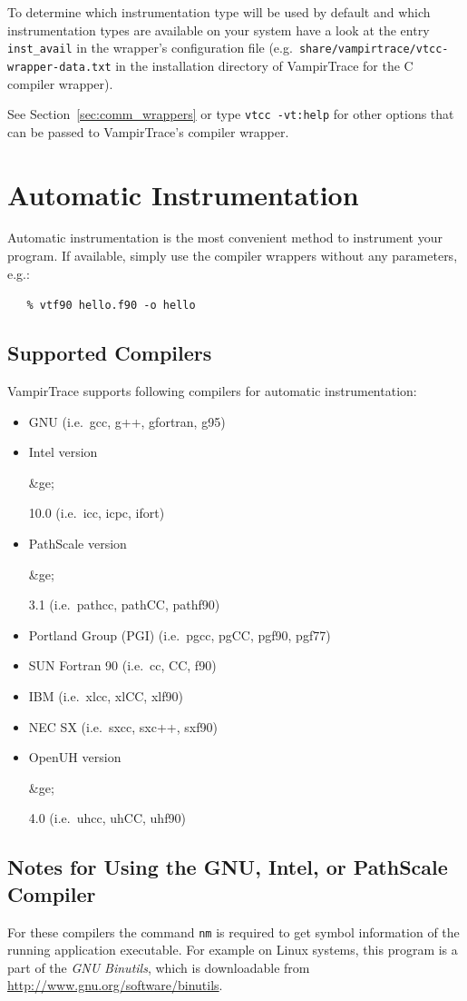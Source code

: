 \documentclass[a4paper,twoside,12pt,BCOR12mm]{scrbook}
\newcommand{\greq}{$\ge$}  %
\renewcommand{\greq}{\begin{rawhtml}&ge;\end{rawhtml}}   %
\newcommand{\pathname}[1]{\nolinkurl{#1}}  %
\renewcommand{\pathname}[1]{\texttt{#1}}   %
\begin{document}
To determine which instrumentation type will be used by default and which instrumentation
types are available on your system have a look at the entry \texttt{inst\_avail} in the
wrapper's configuration file (e.g.~\pathname{share/vampirtrace/vtcc-wrapper-data.txt} in the
installation directory of VampirTrace for the C compiler wrapper).

See Section~\ref{sec:comm_wrappers} or type \texttt{vtcc -vt:help} for other
options that can be passed to VampirTrace's compiler wrapper.


\section{Automatic Instrumentation}
\label{sec:compinst}

Automatic instrumentation is the most convenient method to instrument your program.
If available, simply use the compiler wrappers without any parameters, e.g.:

\vspace{1ex}
\verb|   % vtf90 hello.f90 -o hello|
\vspace{-1ex}

\subsection{Supported Compilers}
VampirTrace supports following compilers for automatic instrumentation:

\begin{itemize}
\item GNU (i.e.~gcc, g++, gfortran, g95)
\item Intel version \greq 10.0 (i.e.~icc, icpc, ifort)
\item PathScale version \greq 3.1 (i.e.~pathcc, pathCC, pathf90)
\item Portland Group (PGI) (i.e.~pgcc, pgCC, pgf90, pgf77)
\item SUN Fortran 90 (i.e.~cc, CC, f90)
\item IBM (i.e.~xlcc, xlCC, xlf90)
\item NEC SX (i.e.~sxcc, sxc++, sxf90)
\item OpenUH version \greq 4.0 (i.e.~uhcc, uhCC, uhf90)
\end{itemize}

\subsection{Notes for Using the GNU, Intel, or PathScale Compiler}
\label{subsec:nmnotes}
For these compilers the command \texttt{nm} is required to get symbol information
of the running application executable. For example on Linux systems, this program is a
part of the \textit{GNU Binutils}, which is downloadable from
\url{http://www.gnu.org/software/binutils}.
\end{document}
